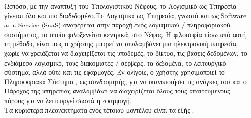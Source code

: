 \documentclass{article}
\begin{document}
Ωστόσο, με την ανάπτυξη του Υπολογιστικού Νέφους, το Λογισμικό ως Υπηρεσία
γίνεται όλο και πιο διαδεδομένο.Το Λογισμικό ως Υπηρεσία, γνωστό και ως
Software as a Service (SaaS)
αναφέρεται στην παροχή ενός λογισμικού /
πληροφοριακού συστήματος, το οποίο φιλοξενείται κεντρικά, στο Νέφος. Η
φιλοσοφία πίσω από αυτή τη μέθοδο, είναι πως ο χρήστης μπορεί να
απολαμβάνει μια ηλεκτρονική υπηρεσία, χωρίς να χρειάζεται να διαχειρίζεται
τις υποδομές, το δίκτυο, τις βάσεις δεδομένων, το ενδιάμεσο λογισμικό,
τους διακομιστές / σέρβερς, τα δεδομένα, το λειτουργικό σύστημα, αλλά ούτε
και τις εφαρμογές. Εν ολίγοις, ο χρήστης χρησιμοποιεί το Πληροφοριακό
Σύστημα , ως συνδρομητής, για να ικανοποιήσει τις ανάγκες του και ο
Πάροχος της υπηρεσίας αναλαμβάνει να διαχειρίζεται όλους τους
απαιτούμενους πόρους για να λειτουργεί σωστά η εφαρμογή.  \\
Τα κυριότερα πλεονεκτήματα ενός τέτοιου μοντέλου είναι τα εξής :
\end{document}
